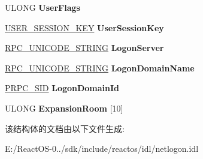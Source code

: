 \begin{DoxyCompactItemize}
U\+L\+O\+NG {\bfseries User\+Flags}
\item 
\mbox{\label{struct___n_e_t_l_o_g_o_n___v_a_l_i_d_a_t_i_o_n___s_a_m___i_n_f_o_ace99da7ac082350e2ec79e50a71c7f19}} 
\hyperlink{struct___u_s_e_r___s_e_s_s_i_o_n___k_e_y}{U\+S\+E\+R\+\_\+\+S\+E\+S\+S\+I\+O\+N\+\_\+\+K\+EY} {\bfseries User\+Session\+Key}
\item 
\mbox{\label{struct___n_e_t_l_o_g_o_n___v_a_l_i_d_a_t_i_o_n___s_a_m___i_n_f_o_a856aa4becd0f4aedba037bf5291ee9eb}} 
\hyperlink{struct___r_p_c___u_n_i_c_o_d_e___s_t_r_i_n_g}{R\+P\+C\+\_\+\+U\+N\+I\+C\+O\+D\+E\+\_\+\+S\+T\+R\+I\+NG} {\bfseries Logon\+Server}
\item 
\mbox{\label{struct___n_e_t_l_o_g_o_n___v_a_l_i_d_a_t_i_o_n___s_a_m___i_n_f_o_a74ed1f147b55b0f4528f24de64b86d37}} 
\hyperlink{struct___r_p_c___u_n_i_c_o_d_e___s_t_r_i_n_g}{R\+P\+C\+\_\+\+U\+N\+I\+C\+O\+D\+E\+\_\+\+S\+T\+R\+I\+NG} {\bfseries Logon\+Domain\+Name}
\item 
\mbox{\label{struct___n_e_t_l_o_g_o_n___v_a_l_i_d_a_t_i_o_n___s_a_m___i_n_f_o_aa960fe9a11934aea604a1ea11eebecb7}} 
\hyperlink{struct___r_p_c___s_i_d}{P\+R\+P\+C\+\_\+\+S\+ID} {\bfseries Logon\+Domain\+Id}
\item 
\mbox{\label{struct___n_e_t_l_o_g_o_n___v_a_l_i_d_a_t_i_o_n___s_a_m___i_n_f_o_a5fff9badac44bfa77c887eba3d96db1a}} 
U\+L\+O\+NG {\bfseries Expansion\+Room} \mbox{[}10\mbox{]}
\end{DoxyCompactItemize}


该结构体的文档由以下文件生成\+:\begin{DoxyCompactItemize}
\item 
E\+:/\+React\+O\+S-\/0../sdk/include/reactos/idl/netlogon.\+idl\end{DoxyCompactItemize}

